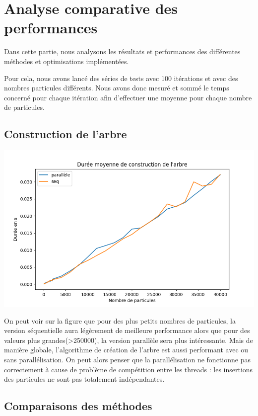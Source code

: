 \chapter{Analyse comparative des  performances}
Dans cette partie, nous analysons les résultats et performances des différentes méthodes et optimisations implémentées.

Pour cela, nous avons lancé des séries de tests avec 100 itérations et avec des nombres particules différents. Nous avons donc mesuré et sommé le temps concerné pour chaque itération afin d'effectuer une moyenne pour chaque nombre de particules.

\section{Construction de l'arbre}
\begin{center}
\includegraphics[scale=0.6]{./resultats/tree_comparison.png}
\label{figbh}
\end{center}

On peut voir sur la figure que pour des plus petits nombres de particules, la version séquentielle aura légèrement de meilleure performance alors que pour des valeurs plus grandes(>250000), la version parallèle sera plus intéressante. Mais de manière globale, l'algorithme de création de l'arbre est aussi performant avec ou sans parallélisation. On peut alors penser que la parallélisation ne fonctionne pas correctement à cause de problème de compétition entre les threads : les insertions des particules ne sont pas totalement indépendantes.

\section{Comparaisons des méthodes}

